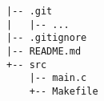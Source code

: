 \begin{verbatim}
|-- .git
|   |-- ...
|-- .gitignore
|-- README.md
+-- src
    |-- main.c
    +-- Makefile
\end{verbatim}
